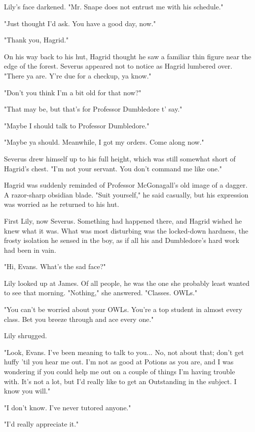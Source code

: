 \documentclass[a4paper,11pt]{article}
\begin{document}
Lily's face darkened. "Mr. Snape does not entrust me with his schedule."

"Just thought I'd ask. You have a good day, now."

"Thank you, Hagrid."

On his way back to his hut, Hagrid thought he saw a familiar thin figure near the edge of the forest. Severus appeared not to notice as Hagrid lumbered over. "There ya are. Y're due for a checkup, ya know."

"Don't you think I'm a bit old for that now?"

"That may be, but that's for Professor Dumbledore t' say."

"Maybe I should talk to Professor Dumbledore."

"Maybe ya should. Meanwhile, I got my orders. Come along now."

Severus drew himself up to his full height, which was still somewhat short of Hagrid's chest. "I'm not your servant. You don't command me like one."

Hagrid was suddenly reminded of Professor McGonagall's old image of a dagger. A razor-sharp obsidian blade. "Suit yourself," he said casually, but his expression was worried as he returned to his hut.

First Lily, now Severus. Something had happened there, and Hagrid wished he knew what it was. What was most disturbing was the locked-down hardness, the frosty isolation he sensed in the boy, as if all his and Dumbledore's hard work had been in vain.

"Hi, Evans. What's the sad face?"

Lily looked up at James. Of all people, he was the one she probably least wanted to see that morning. "Nothing," she answered. "Classes. OWLs."

"You can't be worried about your OWLs. You're a top student in almost every class. Bet you breeze through and ace every one."

Lily shrugged.

"Look, Evans. I've been meaning to talk to you... No, not about that; don't get huffy 'til you hear me out. I'm not as good at Potions as you are, and I was wondering if you could help me out on a couple of things I'm having trouble with. It's not a lot, but I'd really like to get an Outstanding in the subject. I know you will."

"I don't know. I've never tutored anyone."

"I'd really appreciate it."
\end{document}
